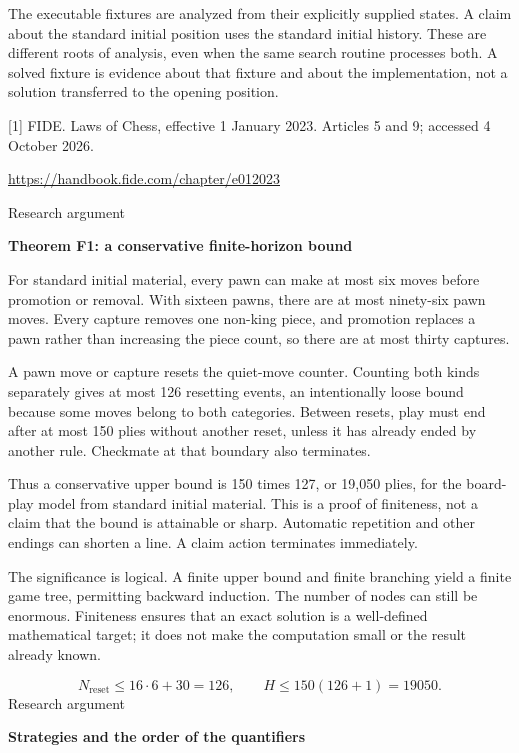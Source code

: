 \documentclass[10pt]{article}
\begin{document}
The executable fixtures are analyzed from their explicitly supplied states. A claim about the standard initial position uses the standard initial history. These are different roots of analysis, even when the same search routine processes both. A solved fixture is evidence about that fixture and about the implementation, not a solution transferred to the opening position.\par
{\small [1] FIDE. Laws of Chess, effective 1 January 2023. Articles 5 and 9; accessed 4 October 2026.\par\url{https://handbook.fide.com/chapter/e012023}\par}
\clearpage
{\small\color{accent}Research argument}\par
{\LARGE\bfseries\color{ink}Theorem F1: a conservative finite-horizon bound}\par\vspace{7pt}
For standard initial material, every pawn can make at most six moves before promotion or removal. With sixteen pawns, there are at most ninety-six pawn moves. Every capture removes one non-king piece, and promotion replaces a pawn rather than increasing the piece count, so there are at most thirty captures.\par
A pawn move or capture resets the quiet-move counter. Counting both kinds separately gives at most 126 resetting events, an intentionally loose bound because some moves belong to both categories. Between resets, play must end after at most 150 plies without another reset, unless it has already ended by another rule. Checkmate at that boundary also terminates.\par
Thus a conservative upper bound is 150 times 127, or 19,050 plies, for the board-play model from standard initial material. This is a proof of finiteness, not a claim that the bound is attainable or sharp. Automatic repetition and other endings can shorten a line. A claim action terminates immediately.\par
The significance is logical. A finite upper bound and finite branching yield a finite game tree, permitting backward induction. The number of nodes can still be enormous. Finiteness ensures that an exact solution is a well-defined mathematical target; it does not make the computation small or the result already known.\par
\[N_{\mathrm{reset}}\leq16\cdot6+30=126,\qquad H\leq150(126+1)=19050.\]
\clearpage
{\small\color{accent}Research argument}\par
{\LARGE\bfseries\color{ink}Strategies and the order of the quantifiers}\par\vspace{7pt}
\end{document}

